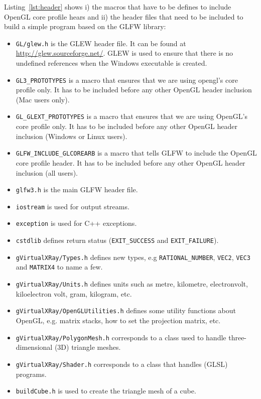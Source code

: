 \documentclass[11pt,oneside,a4paper,final]{article}
\begin{document}
Listing~\ref{lst:header} shows i) the macros that have to be defines to include 
OpenGL core profile hears and ii) the header files that need to be included to 
build a simple program based on the GLFW 
library:
\begin{itemize}
 \item \verb+GL/glew.h+ is the GLEW header file. It can be found at 
  \url{http://glew.sourceforge.net/}. GLEW is used to ensure that there is no 
  undefined references when the Windows executable is created.
 \item \verb+GL3_PROTOTYPES+ is a macro that ensures that we are using opengl's 
core profile only. It has to be included before any other OpenGL header 
inclusion (Mac users only).
 \item \verb+GL_GLEXT_PROTOTYPES+ is a macro that ensures that we are using 
OpenGL's core profile only. It has to be included before any other OpenGL header 
inclusion (Windows or Linux users).
 \item \verb+GLFW_INCLUDE_GLCOREARB+ is a macro that tells GLFW to include the 
OpenGL core profile header. It has to be included before any other OpenGL header 
inclusion (all users).
 \item \verb+glfw3.h+ is the main GLFW header file.
 \item \verb+iostream+ is used for output streams.
 \item \verb+exception+ is used for C++ exceptions.
 \item \verb+cstdlib+ defines return status (\verb+EXIT_SUCCESS+ and 
	\verb+EXIT_FAILURE+).
 \item \verb+gVirtualXRay/Types.h+ defines new types, e.g 
\verb+RATIONAL_NUMBER+, 
	\verb+VEC2+, \verb+VEC3+ and \verb+MATRIX4+ to name a few.
 \item \verb+gVirtualXRay/Units.h+ defines units such as metre, kilometre, 
electronvolt, 
	kiloelectron volt, gram, kilogram, etc.
 \item \verb+gVirtualXRay/OpenGLUtilities.h+ defines some utility functions 
about OpenGL, 
	e.g. matrix stacks, how to set the projection matrix, etc.
 \item \verb+gVirtualXRay/PolygonMesh.h+ corresponds to a class used to handle 
three-dimensional (3D) triangle meshes.
 \item \verb+gVirtualXRay/Shader.h+ corresponds to a class that handles 
(GLSL) programs.
 \item \verb+buildCube.h+ is used to create the triangle mesh of a cube.
\end{itemize}
\end{document}
